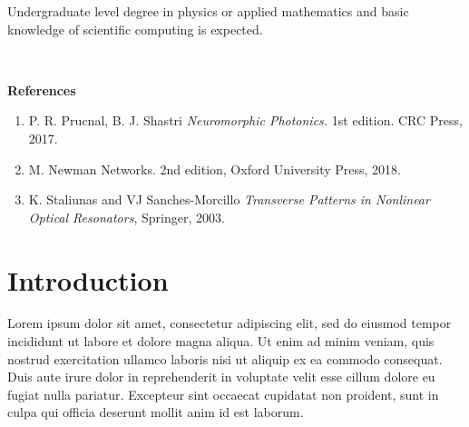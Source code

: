 \documentclass{article}
\begin{document}
\begin{titlepage}
        \noindent Undergraduate level degree in physics or applied mathematics and basic knowledge of scientific computing is expected.

        \ 

        \begin{flushleft}
          \Large \textbf{References}
        \end{flushleft}

        \begin{enumerate}
          \item P. R. Prucnal, B. J. Shastri \textit{Neuromorphic Photonics.} 1st edition. CRC Press, 2017.
          \item M. Newman \textit{}{Networks}. 2nd edition, Oxford University Press, 2018.
          \item K. Staliunas and VJ Sanches-Morcillo \textit{Transverse Patterns in Nonlinear Optical Resonators}, Springer, 2003.

        \end{enumerate}
        
        \vfill
    \end{titlepage}
  
  \section{Introduction}
  
  Lorem ipsum dolor sit amet, consectetur adipiscing elit, sed do eiusmod tempor incididunt ut labore et dolore magna aliqua. Ut enim ad minim veniam, quis nostrud exercitation ullamco laboris nisi ut aliquip ex ea commodo consequat. Duis aute irure dolor in reprehenderit in voluptate velit esse cillum dolore eu fugiat nulla pariatur. Excepteur sint occaecat cupidatat non proident, sunt in culpa qui officia deserunt mollit anim id est laborum. 

  
\end{document}
